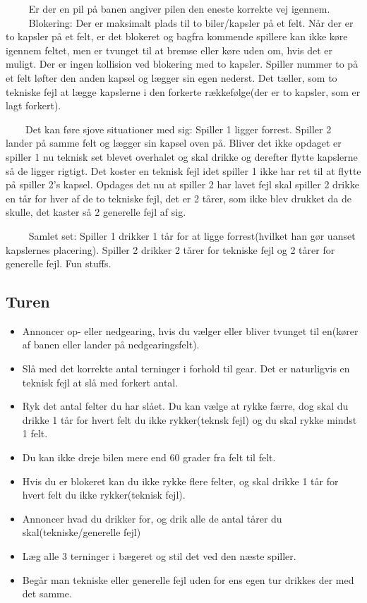 \documentclass[12pt]{article}
\begin{document}
$\qquad$ Er der en pil på banen angiver pilen den eneste korrekte vej igennem.\\

$\qquad$ Blokering: Der er maksimalt plads til to biler/kapsler på et felt. Når der er to kapsler på et felt, er det blokeret og bagfra kommende spillere kan ikke køre igennem feltet, men er tvunget til at bremse eller køre uden om, hvis det er muligt. Der er ingen kollision ved blokering med to kapsler. Spiller nummer to på et felt løfter den anden kapsel og lægger sin egen nederst. Det tæller, som to tekniske fejl at lægge kapslerne i den forkerte rækkefølge(der er to kapsler, som er lagt forkert).

$\qquad$Det kan føre sjove situationer med sig: Spiller 1 ligger forrest. Spiller 2 lander på samme felt og lægger sin kapsel oven på. Bliver det ikke opdaget er spiller 1 nu teknisk set blevet overhalet og skal drikke og derefter flytte kapslerne så de ligger rigtigt. Det koster en teknisk fejl idet spiller 1 ikke har ret til at flytte på spiller 2's kapsel. Opdages det nu at spiller 2 har lavet fejl skal spiller 2 drikke en tår for hver af de to tekniske fejl, det er 2 tårer, som ikke blev drukket da de skulle, det kaster så 2 generelle fejl af sig.

$\qquad$ Samlet set: Spiller 1 drikker 1 tår for at ligge forrest(hvilket han gør uanset kapslernes placering).
Spiller 2 drikker 2 tårer for tekniske fejl og 2 tårer for generelle fejl.
Fun stuffs.


\subsection*{Turen}

\begin{itemize}
	\item Annoncer op- eller nedgearing, hvis du vælger eller bliver tvunget til en(kører af banen eller lander på nedgearingsfelt).
	\item Slå med det korrekte antal terninger i forhold til gear. Det er naturligvis en teknisk fejl at slå med forkert antal.
	\item Ryk det antal felter du har slået. Du kan vælge at rykke færre, dog skal du drikke 1 tår for hvert felt du ikke rykker(teknsk fejl) og du skal rykke mindst 1 felt.
	\item Du kan ikke dreje bilen mere end 60 grader fra felt til felt.
	\item Hvis du er blokeret kan du ikke rykke flere felter, og skal drikke 1 tår for hvert felt du ikke rykker(teknisk fejl).
	\item Annoncer hvad du drikker for, og drik alle de antal tårer du skal(tekniske/generelle fejl)
	\item Læg alle 3 terninger i bægeret og stil det ved den næste spiller.
	\item Begår man tekniske eller generelle fejl uden for ens egen tur drikkes der med det samme.
\end{itemize}
\end{document}
